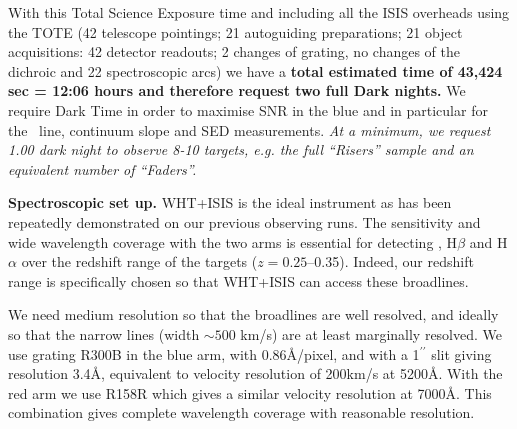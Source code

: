 \documentclass[a4paper,fleqn,usenatbib]{mnras}
\begin{document}
\smallskip
\smallskip
With this Total Science Exposure time and including all the ISIS
overheads using the TOTE (42 telescope pointings; 21 autoguiding
preparations; 21 object acquisitions: 42 detector readouts; 2 changes
of grating, no changes of the dichroic and 22 spectroscopic arcs) we
 have a {\bf total estimated time of 43,424 sec = 12:06 hours and 
therefore request two full Dark nights.}  We require Dark Time in
order to maximise SNR in the blue and in particular for the \mgii\ line, 
continuum slope and SED measurements.  {\it At a minimum, we request 1.00 dark
night to observe 8-10 targets, e.g. the full ``Risers'' sample and an
equivalent number of ``Faders''.}

\vskip 0.2cm
{\bf Spectroscopic set up.} 
WHT+ISIS is the ideal instrument as has been repeatedly demonstrated
on our previous observing runs.  The sensitivity and wide wavelength
coverage with the two arms is essential for detecting \mgii, H$\beta$
and H$\alpha$ over the redshift range of the targets ($z=0.25$--0.35).
Indeed, our redshift range is specifically chosen so that WHT+ISIS
can access these broadlines.

\smallskip
\smallskip
We need medium resolution so that the broadlines are well
resolved, and ideally so that the narrow lines (width $\sim 500$ km/s)
are at least marginally resolved. We use grating R300B in the blue
arm, with 0.86\AA /pixel, and with a 1$^{\prime\prime}$ slit giving
resolution 3.4\AA , equivalent to velocity resolution of 200km/s at
5200\AA . With the red arm we use R158R which gives a similar velocity
resolution at 7000\AA.  This combination gives complete wavelength
coverage with reasonable resolution. 

\end{document}
